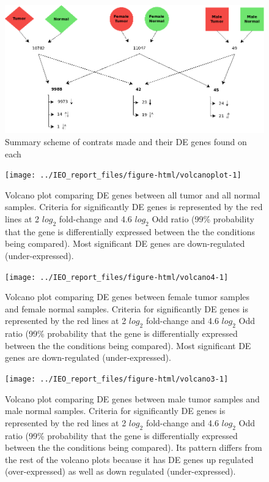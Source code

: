 \documentclass[9pt,twocolumn,twoside]{gsajnl}
\begin{document}
\begin{figure}
\centering
\includegraphics[width=\linewidth]{scheme}
\caption{Summary scheme of contrats made and their DE genes found on each}
\label{fig:scheme}
\end{figure}

\begin{figure}
\centering
\texttt{[image: ../IEO\_report\_files/figure-html/volcanoplot-1]}
\caption{Volcano plot comparing DE genes between all tumor and all normal samples. Criteria for significantly DE genes is represented by the red lines at 2 $log_{2}$ fold-change and 4.6  $log_{2}$ Odd ratio (99\% probability that the gene is differentially expressed between the the conditions being compared). Most significant DE genes are down-regulated (under-expressed).}
\label{fig:volcano1}
\end{figure}

\begin{figure}
\centering
\texttt{[image: ../IEO\_report\_files/figure-html/volcano4-1]}
\caption{Volcano plot comparing DE genes between female tumor samples and female normal samples. Criteria for significantly DE genes is represented by the red lines at 2 $log_{2}$ fold-change and 4.6 $log_{2}$ Odd ratio (99\% probability that the gene is differentially expressed between the the conditions being compared). Most significant DE genes are down-regulated (under-expressed).}
\label{fig:volcano2}
\end{figure}

\begin{figure}
\centering
\texttt{[image: ../IEO\_report\_files/figure-html/volcano3-1]}
\caption{Volcano plot comparing DE genes between male tumor samples and male normal samples. Criteria for significantly DE genes is represented by the red lines at 2 $log_{2}$ fold-change and 4.6 $log_{2}$ Odd ratio (99\% probability that the gene is differentially expressed between the the conditions being compared). Its pattern differs from the rest of the volcano plots because it has DE genes up regulated (over-expressed) as well as down regulated (under-expressed).}
\label{fig:volcano3}
\end{figure}
\end{document}
